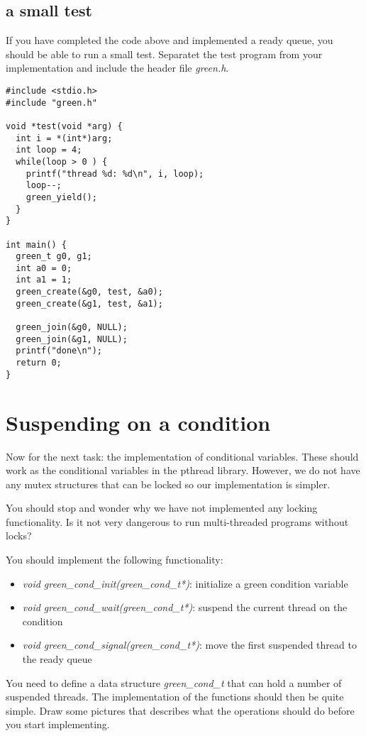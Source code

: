 \documentclass[a4paper,11pt]{article}
\begin{document}
\subsection{a small test}

If you have completed the code above and implemented a ready queue,
you should be able to run a small test. Separatet the test program
from your implementation and include the header file {\em green.h}. 

\begin{lstlisting}
#include <stdio.h>
#include "green.h"

void *test(void *arg) {
  int i = *(int*)arg;
  int loop = 4;
  while(loop > 0 ) {
    printf("thread %d: %d\n", i, loop);
    loop--;
    green_yield();
  }
}

int main() {
  green_t g0, g1;
  int a0 = 0;
  int a1 = 1;
  green_create(&g0, test, &a0);
  green_create(&g1, test, &a1);

  green_join(&g0, NULL);
  green_join(&g1, NULL);
  printf("done\n");
  return 0;
}
\end{lstlisting}

\section{Suspending on a condition}

Now for the next task: the implementation of conditional
variables. These should work as the conditional variables in the
pthread library. However, we do not have any mutex structures that can
be locked so our implementation is simpler.

You should stop and wonder why we have not implemented any locking
functionality. Is it not very dangerous to run multi-threaded programs
without locks? 

You should implement the following functionality:

\begin{itemize}
\item {\em void green\_cond\_init(green\_cond\_t*)}: initialize a green condition variable
\item {\em void green\_cond\_wait(green\_cond\_t*)}: suspend the current thread on the condition
\item {\em void green\_cond\_signal(green\_cond\_t*)}: move the first suspended thread to the ready queue
\end{itemize}

You need to define a data structure {\em green\_cond\_t} that can hold a
number of suspended threads. The implementation of the functions
should then be quite simple. Draw some pictures that describes what the
operations should do before you start implementing.
\end{document}
